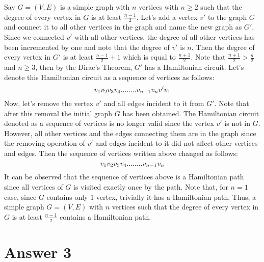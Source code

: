 \documentclass[11pt]{article}
\begin{document}
Say $G = (V, E)$ is a simple graph with $n$ vertices with $n \geq 2$ such that the degree of every vertex in $G$ is at least $\frac{n - 1}{2}$. Let's add a vertex $v'$ to the graph $G$ and connect it to all other vertices in the graph and name the new graph as $G'$. Since we connected $v'$ with all other vertices, the degree of all other vertices has been incremented by one and note that the degree of $v'$ is $n$. Then the degree of every vertex in $G'$ is at least $\frac{n - 1}{2} + 1$ which is equal to $\frac{n + 1}{2}$. Note that $\frac{n + 1}{2} > \frac{n}{2}$ and $n \geq 3$, then by the Dirac's Theorem, $G'$ has a Hamiltonian circuit. Let's denote this Hamiltonian circuit as a sequence of vertices as follows:
\begin{equation*}
    v_1v_2v_3v_4........v_{n - 1}v_{n}v'v_1\\
\end{equation*}
Now, let's remove the vertex $v'$ and all edges incident to it from $G'$. Note that after this removal the initial graph $G$ has been obtained. The Hamiltonian circuit denoted as a sequence of vertices is no longer valid since the vertex $v'$ is not in $G$. However, all other vertices and the edges connecting them are in the graph since the removing operation of $v'$ and edges incident to it did not affect other vertices and edges. Then the sequence of vertices written above changed as follows:
\begin{equation*}
    v_1v_2v_3v_4........v_{n - 1}v_{n}\\
\end{equation*}
It can be observed that the sequence of vertices above is a Hamiltonian path since all vertices of $G$ is visited exactly once by the path. Note that, for $n = 1$ case, since $G$ contains only $1$ vertex, trivially it has a Hamiltonian path. Thus, a simple graph $G = (V, E)$ with $n$ vertices such that the degree of every vertex in $G$ is at least $\frac{n - 1}{2}$ contains a Hamiltonian path.


\section*{Answer 3}
\end{document}
